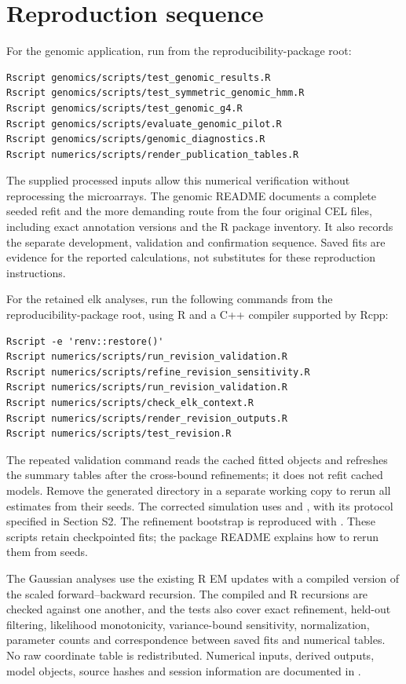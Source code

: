 \documentclass[11pt]{article}
\begin{document}
\section{Reproduction sequence}\label{sec:reproduction}

For the genomic application, run from the reproducibility-package root:
\begin{verbatim}
Rscript genomics/scripts/test_genomic_results.R
Rscript genomics/scripts/test_symmetric_genomic_hmm.R
Rscript genomics/scripts/test_genomic_g4.R
Rscript genomics/scripts/evaluate_genomic_pilot.R
Rscript genomics/scripts/genomic_diagnostics.R
Rscript numerics/scripts/render_publication_tables.R
\end{verbatim}
The supplied processed inputs allow this numerical verification without
reprocessing the microarrays. The genomic README documents a complete
seeded refit and the more demanding route from the four original CEL files,
including exact annotation versions and the R package inventory. It also
records the separate development, validation and confirmation sequence.
Saved fits are evidence for the reported calculations, not substitutes for
these reproduction instructions.

For the retained elk analyses, run the following commands from the
reproducibility-package root, using R and a C++ compiler supported by Rcpp:
\begin{verbatim}
Rscript -e 'renv::restore()'
Rscript numerics/scripts/run_revision_validation.R
Rscript numerics/scripts/refine_revision_sensitivity.R
Rscript numerics/scripts/run_revision_validation.R
Rscript numerics/scripts/check_elk_context.R
Rscript numerics/scripts/render_revision_outputs.R
Rscript numerics/scripts/test_revision.R
\end{verbatim}
The repeated validation command reads the cached fitted objects and refreshes
the summary tables after the cross-bound refinements; it does not refit cached
models. Remove the generated  directory in a
separate working copy to rerun all estimates from their seeds. The corrected
simulation uses  and
, with its protocol
specified in Section S2. The refinement bootstrap is reproduced with
. These scripts retain
checkpointed fits; the package README explains how to rerun them from seeds.

The Gaussian analyses use the existing R EM updates with a compiled version of the
scaled forward--backward recursion. The compiled and R recursions are checked
against one another, and the tests also cover exact refinement, held-out
filtering, likelihood monotonicity, variance-bound sensitivity, normalization,
parameter counts and correspondence between saved fits and numerical tables.
No raw coordinate table is redistributed. Numerical inputs, derived outputs,
model objects, source hashes and session information are documented in
.
\end{document}
